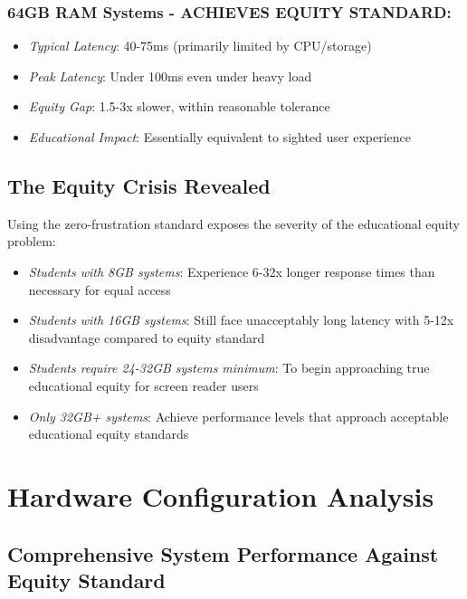 \subsubsection{64GB RAM Systems - ACHIEVES EQUITY STANDARD:}

\begin{itemize}
\item \emph{Typical Latency}: 40-75ms (primarily limited by CPU/storage)
\item \emph{Peak Latency}: Under 100ms even under heavy load
\item \emph{Equity Gap}: 1.5-3x slower, within reasonable tolerance
\item \emph{Educational Impact}: Essentially equivalent to sighted user experience
\end{itemize}

\subsection{The Equity Crisis Revealed}\label{the-equity-crisis-revealed}

Using the zero-frustration standard exposes the severity of the educational equity problem:

\begin{itemize}
\item \emph{Students with 8GB systems}: Experience 6-32x longer response times than necessary for equal access
\item \emph{Students with 16GB systems}: Still face unacceptably long latency with 5-12x disadvantage compared to equity standard
\item \emph{Students require 24-32GB systems minimum}: To begin approaching true educational equity for screen reader users
\item \emph{Only 32GB+ systems}: Achieve performance levels that approach acceptable educational equity standards
\end{itemize}

\hypertarget{hardware-configuration-analysis}{}\section{Hardware Configuration Analysis}\label{hardware-configuration-analysis}
\subsection{Comprehensive System Performance Against Equity Standard}\label{comprehensive-system-performance-against-equity-standard}

